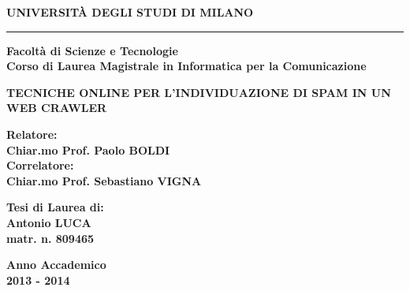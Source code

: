 \begin{titlepage}
\begin{center}

{{\Large{{\bf UNIVERSIT\`A DEGLI STUDI DI MILANO}}}}
\rule[0.1cm]{13cm}{0.6mm}
{\bf Facoltà di Scienze e Tecnologie\\
Corso di Laurea Magistrale in Informatica per la Comunicazione}
\end{center}
\vspace{15mm}
\begin{center}
\vspace{3mm}
{\LARGE{\bf TECNICHE ONLINE PER L'INDIVIDUAZIONE DI SPAM IN UN WEB CRAWLER}}\\
\vspace{3mm}
\end{center}

\vspace{40mm}
\par
\noindent
\begin{minipage}[t]{0.60\textwidth}
{\large{\bf Relatore:\\
Chiar.mo Prof. Paolo BOLDI}}\\
{\large{\bf Correlatore:\\
Chiar.mo Prof. Sebastiano VIGNA}}
\end{minipage}
\hfill
\begin{minipage}[t]{0.47\textwidth}\raggedleft
{\large{\bf Tesi di Laurea di:\\
Antonio LUCA\\
matr. n. 809465}}
\end{minipage}
\vspace{20mm}
\begin{center}
{\large{\bf %
Anno Accademico\\ 2013 - 2014 }}%
\end{center}
\end{titlepage}